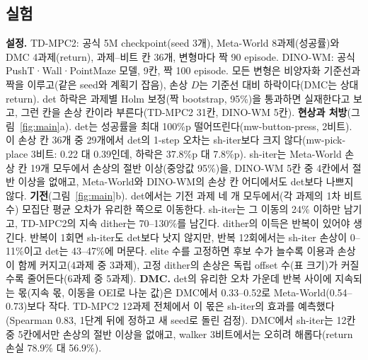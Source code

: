 \documentclass[nouppercase]{kaia}
\newcommand{\shiter}{\textsf{sh-iter}}
\newcommand{\dtm}{\textsf{det}}
\begin{document}
\begin{mdframed}
\subsection{실험}
\textbf{설정.} TD-MPC2: 공식 5M checkpoint(seed 3개), Meta-World 8과제(성공률)와 DMC 4과제(return), 과제--비트 칸 36개, 변형마다 짝 90 episode. DINO-WM: 공식 PushT·Wall·PointMaze 모델, 9칸, 짝 100 episode. 모든 변형은 비양자화 기준선과 짝을 이루고(같은 seed와 계획기 잡음), 손상 $D$는 기준선 대비 하락이다(DMC는 상대 return). \dtm{} 하락은 과제별 Holm 보정(짝 bootstrap, 95\%)을 통과하면 실재한다고 보고, 그런 칸을 손상 칸이라 부른다(TD-MPC2 31칸, DINO-WM 5칸).
\textbf{현상과 처방}(그림~\ref{fig:main}a). \dtm{}는 성공률을 최대 100\%p 떨어뜨린다(mw-button-press, 2비트). 이 손상 칸 36개 중 29개에서 \dtm{}의 1-step 오차는 \shiter{}보다 크지 않다(mw-pick-place 3비트: 0.22 대 0.39인데, 하락은 37.8\%p 대 7.8\%p). \shiter{}는 Meta-World 손상 칸 19개 모두에서 손상의 절반 이상(중앙값 95\%)을, DINO-WM 5칸 중 4칸에서 절반 이상을 없애고, Meta-World와 DINO-WM의 손상 칸 어디에서도 \dtm{}보다 나쁘지 않다.
\textbf{기전}(그림~\ref{fig:main}b). \dtm{}에서는 기전 과제 네 개 모두에서(각 과제의 1차 비트 수) 모집단 평균 오차가 유리한 쪽으로 이동한다. \shiter{}는 그 이동의 24\% 이하만 남기고, TD-MPC2의 지속 dither는 70--130\%를 남긴다. dither의 이득은 반복이 있어야 생긴다. 반복이 1회면 \shiter{}도 \dtm{}보다 낫지 않지만, 반복 12회에서는 \shiter{} 손상이 0--11\%이고 \dtm{}는 43--47\%에 머문다. elite 수를 고정하면 후보 수가 늘수록 이용과 손상이 함께 커지고(4과제 중 3과제), 고정 dither의 손상은 독립 offset 수(표 크기)가 커질수록 줄어든다(6과제 중 5과제).
\textbf{DMC.} \dtm{}의 유리한 오차 가운데 반복 사이에 지속되는 몫(지속 몫, 이동을 OEI로 나눈 값)은 DMC에서 0.33--0.52로 Meta-World(0.54--0.73)보다 작다. TD-MPC2 12과제 전체에서 이 몫은 \shiter{}의 효과를 예측했다(Spearman 0.83, 1단계 뒤에 정하고 새 seed로 돌린 검정). DMC에서 \shiter{}는 12칸 중 5칸에서만 손상의 절반 이상을 없애고, walker 3비트에서는 오히려 해롭다(return 손실 78.9\% 대 56.9\%).


\end{mdframed}
\end{document}
